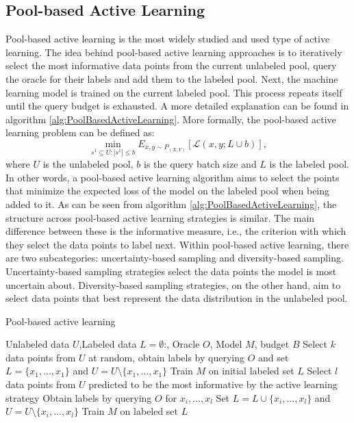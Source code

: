 \subsection{Pool-based Active Learning}
\label{sec:PoolBasedActiveLearning}
Pool-based active learning is the most widely studied and used type of active learning. The idea behind pool-based active learning approaches
is to iteratively select the most informative data points from the current unlabeled pool, query the oracle for their labels and add them to the
labeled pool. Next, the machine learning model is trained on the current labeled pool. This process repeats itself until the query budget is exhausted.
A more detailed explanation can be found in algorithm \ref{alg:PoolBasedActiveLearning}. More formally, the pool-based active learning problem
can be defined as:
\begin{equation}
    \min_{s^1 \subseteq U: |s^1| \leq b} E_{x,y \sim P_{(X,Y)}}[\mathcal{L}(x,y;L \cup b)],
\end{equation}
where $U$ is the unlabeled pool, $b$ is the query batch size and $L$ is the labeled pool.
In other words, a pool-based active learning algorithm aims to select the points that minimize the expected loss of the model on the labeled pool when
being added to it. As can be seen from algorithm \ref{alg:PoolBasedActiveLearning}, the structure across pool-based active learning strategies is similar.
The main difference between these is the informative measure, i.e., the criterion with which they select the data points to label next. Within 
pool-based active learning, there are two subcategories: uncertainty-based sampling and diversity-based sampling. 
Uncertainty-based sampling strategies select the data points the model is most uncertain about. Diversity-based sampling strategies, on the other
hand, aim to select data points that best represent the data distribution in the unlabeled pool.

\begin{algorithm}
    \caption{Pool-based active learning} \label{alg:PoolBasedActiveLearning}
    \begin{algorithmic}[1]
        \Require Unlabeled data $U$,Labeled data $L = \emptyset$:, Oracle $O$, Model $M$, budget $B$
        \State Select $k$ data points from $U$ at random, obtain labels by querying $O$ and set $L=\{x_1,\ldots,x_1\}$
        and $U = U \setminus \{x_1,\ldots,x_1\}$ 
        \State Train $M$ on initial labeled set $L$
            \State Select $l$ data points from $U$ predicted to be the most informative by the active learning strategy
            \State Obtain labels by querying $O$ for $x_i,\ldots,x_l$
            \State Set $L= L \cup \{x_i,\ldots,x_l\}$ and $U = U \setminus \{x_i,\ldots,x_l\}$
            \State Train $M$ on labeled set $L$
        \EndWhile
    \end{algorithmic}
\end{algorithm}

